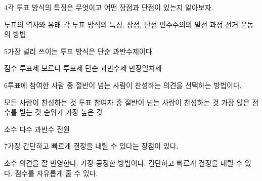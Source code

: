\documentclass[fs85,seriesRus]{korfarm-base}
\begin{document}
\begin{kfSentenceUnit}{4}{각 투표 방식의 특징은 무엇이고 어떤 장점과 단점이 있는지 알아보자.}
\begin{kfChoices}
\kfChoice 투표의 역사와 유래
\kfChoice 각 투표 방식의 특징, 장점, 단점
\kfChoice 민주주의의 발전 과정
\kfChoice 선거 운동의 방법
\end{kfChoices}
\end{kfSentenceUnit}

\begin{kfSentenceUnit}{5}{가장 널리 쓰이는 투표 방식은 단순 과반수제이다.}
\begin{kfChoices}
\kfChoice 점수 투표제
\kfChoice 보르다 투표제
\kfChoice 단순 과반수제
\kfChoice 만장일치제
\end{kfChoices}
\end{kfSentenceUnit}

\begin{kfSentenceUnit}{6}{투표에 참여한 사람 중 절반이 넘는 사람이 찬성하는 의견을 선택하는 방법이다.}
\begin{kfChoices}
\kfChoice 모든 사람이 찬성하는 것
\kfChoice 투표 참여자 중 절반이 넘는 사람이 찬성하는 것
\kfChoice 가장 많은 점수를 받는 것
\kfChoice 순위가 가장 높은 것
\end{kfChoices}
\begin{kfChoices}
\kfChoice 소수
\kfChoice 다수
\kfChoice 과반수
\kfChoice 전원
\end{kfChoices}
\end{kfSentenceUnit}

\begin{kfSentenceUnit}{7}{가장 간단하고 빠르게 결정을 내릴 수 있다는 장점이 있다.}
\begin{kfChoices}
\kfChoice 소수 의견을 잘 반영한다.
\kfChoice 가장 공정한 방법이다.
\kfChoice 간단하고 빠르게 결정을 내릴 수 있다.
\kfChoice 점수를 자유롭게 줄 수 있다.
\end{kfChoices}
\end{kfSentenceUnit}
\end{document}
